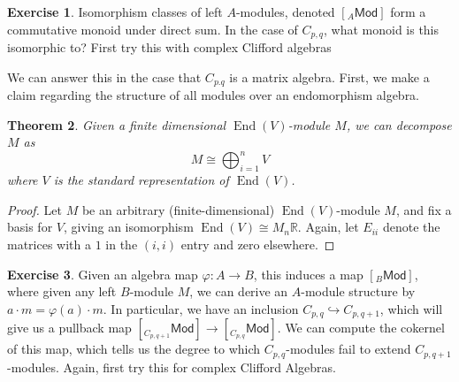 \documentclass[psamsfonts]{amsart}
\newtheorem{thm}{Theorem}[section]
\theoremstyle{definition}
\newtheorem{exer}[thm]{Exercise}
\theoremstyle{remark}
\newcommand{\R}{\mathbb{R}}
\DeclareMathOperator{\End}{End}
\begin{document}
%
\begin{exer}
Isomorphism classes of left $A$-modules, denoted $[ _A \mathsf{Mod} ]$ form a commutative monoid under direct sum. In the case of $C_{p,q}$, what monoid is this isomorphic to? First try this with complex Clifford algebras
\end{exer}
We can answer this in the case that $C_{p.q}$ is a matrix algebra. First, we make a claim regarding the structure of all modules over an endomorphism algebra.
%
\begin{thm}
Given a finite dimensional $\End(V)$-module $M$, we can decompose $M$ as 
$$M \cong \bigoplus_{i=1}^n V $$
where $V$ is the standard representation of $\End(V)$.
\end{thm}
%
\begin{proof}
Let $M$ be an arbitrary (finite-dimensional) $\End(V)$-module $M$, and fix a basis for $V$, giving an isomorphism $\End(V) \cong M_n\R$. Again, let $E_{ii}$ denote the matrices with a $1$ in the $(i,i)$ entry and zero elsewhere.
\TODO
\end{proof}
%
\begin{exer}
Given an algebra map $\varphi: A \to B$, this induces a map $[ _B \mathsf{Mod}]$, where given any left $B$-module $M$, we can derive an $A$-module structure by $a \cdot m = \varphi(a) \cdot m$. In particular, we have an inclusion $C_{p,q} \hookrightarrow C_{p,q+1}$, which will give us a pullback map $[ _{C_{p,q+1}}\mathsf{Mod} ] \to [ _{C_{p,q}}\mathsf{Mod}]$. We can compute the cokernel of this map, which tells us the degree to which $C_{p,q}$-modules fail to extend $C_{p,q+1}$-modules. Again, first try this for complex Clifford Algebras.
\end{exer}
%
\setcounter{thm}{0}
%
\setcounter{section}{9}
%
\end{document}
